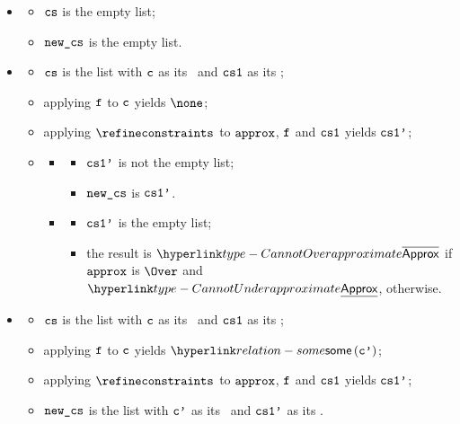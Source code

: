 \ProseParagraph
\OneApplies
\begin{itemize}
  \item {}
  \begin{itemize}
    \item $\texttt{cs}$ is the empty list;
    \item $\texttt{new\_cs}$ is the empty list.
  \end{itemize}

  \item \AllApply
  \begin{itemize}
    \item $\texttt{cs}$ is the list with $\texttt{c}$ as its \head\ and $\texttt{cs1}$ as its \tail;
    \item applying $\texttt{f}$ to $\texttt{c}$ yields $\none$;
    \item applying $\refineconstraints$ to $\texttt{approx}$, $\texttt{f}$ and $\texttt{cs1}$ yields $\texttt{cs1'}$;
    \item \OneApplies
    \begin{itemize}
      \item {}
      \begin{itemize}
        \item $\texttt{cs1'}$ is not the empty list;
        \item $\texttt{new\_cs}$ is $\texttt{cs1'}$.
      \end{itemize}

      \item {}
      \begin{itemize}
        \item $\texttt{cs1'}$ is the empty list;
        \item the result is $\CannotOverapproximate$ if $\texttt{approx}$ is $\Over$ and $\CannotUnderapproximate$, otherwise.
      \end{itemize}
    \end{itemize}
  \end{itemize}

  \item {}
  \begin{itemize}
    \item $\texttt{cs}$ is the list with $\texttt{c}$ as its \head\ and $\texttt{cs1}$ as its \tail;
    \item applying $\texttt{f}$ to $\texttt{c}$ yields $\some{\vcp}$;
    \item applying $\refineconstraints$ to $\texttt{approx}$, $\texttt{f}$ and $\texttt{cs1}$ yields $\texttt{cs1'}$;
    \item $\texttt{new\_cs}$ is the list with $\texttt{c'}$ as its \head\ and $\texttt{cs1'}$ as its \tail.
  \end{itemize}
\end{itemize}

